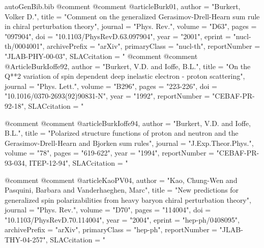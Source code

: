 \begin{filecontents*}{autoGenBib.bib}
@comment %
@comment %
@article{Burk01,
      author         = "Burkert, Volker D.",
      title          = "{Comment on the generalized Gerasimov-Drell-Hearn sum rule in chiral perturbation theory}",
      journal        = "Phys. Rev.",
      volume         = "D63",
      pages          = "097904",
      doi            = "10.1103/PhysRevD.63.097904",
      year           = "2001",
      eprint         = "nucl-th/0004001",
      archivePrefix  = "arXiv",
      primaryClass   = "nucl-th",
      reportNumber   = "JLAB-PHY-00-03",
      SLACcitation   = "%
}
@comment %
@comment %
@Article{BurkIoffe92,
      author         = "Burkert, V.D. and Ioffe, B.L.",
      title          = "{On the Q**2 variation of spin dependent deep inelastic electron - proton scattering}",
      journal        = "Phys. Lett.",
      volume         = "B296",
      pages          = "223-226",
      doi            = "10.1016/0370-2693(92)90831-N",
      year           = "1992",
      reportNumber   = "CEBAF-PR-92-18",
      SLACcitation   = "%
}

@comment %
@comment %
@article{BurkIoffe94,
      author         = "Burkert, V.D. and Ioffe, B.L.",
      title          = "{Polarized structure functions of proton and neutron and
                        the Gerasimov-Drell-Hearn and Bjorken sum rules}",
      journal        = "J.Exp.Theor.Phys.",
      volume         = "78",
      pages          = "619-622",
      year           = "1994",
      reportNumber   = "CEBAF-PR-93-034, ITEP-12-94",
      SLACcitation   = "%
}

@comment %
@comment %
@article{KaoPV04,
      author         = "Kao, Chung-Wen and Pasquini, Barbara and Vanderhaeghen, Marc",
      title          = "{New predictions for generalized spin polarizabilities from heavy baryon chiral perturbation theory}",
      journal        = "Phys. Rev.",
      volume         = "D70",
      pages          = "114004",
      doi            = "10.1103/PhysRevD.70.114004",
      year           = "2004",
      eprint         = "hep-ph/0408095",
      archivePrefix  = "arXiv",
      primaryClass   = "hep-ph",
      reportNumber   = "JLAB-THY-04-257",
      SLACcitation   = "%
}


\end{filecontents*}
